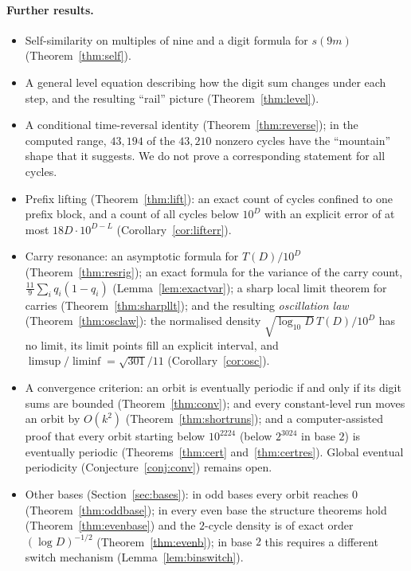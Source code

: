 \documentclass[11pt]{article}
\theoremstyle{definition}
\theoremstyle{remark}
\begin{document}
\paragraph{Further results.}
\begin{itemize}
\item Self-similarity on multiples of nine and a digit formula for $s(9m)$
  (Theorem~\ref{thm:self}).
\item A general level equation describing how the digit sum changes under
  each step, and the resulting ``rail'' picture (Theorem~\ref{thm:level}).
\item A conditional time-reversal identity (Theorem~\ref{thm:reverse}); in the
  computed range, $43{,}194$ of the $43{,}210$ nonzero cycles have the ``mountain'' shape
  that it suggests. We do not prove a corresponding statement for all cycles.
\item Prefix lifting (Theorem~\ref{thm:lift}): an exact count of cycles
  confined to one prefix block, and a count of all cycles below $10^D$ with an
  explicit error of at most $18D\cdot10^{D-L}$ (Corollary~\ref{cor:lifterr}).
\item Carry resonance: an asymptotic formula for $T(D)/10^D$
  (Theorem~\ref{thm:resrig}); an exact formula for the variance of the carry
  count, $\frac{11}9\sum_i q_i(1-q_i)$ (Lemma~\ref{lem:exactvar}); a sharp local
  limit theorem for carries (Theorem~\ref{thm:sharpllt}); and the resulting
  \emph{oscillation law} (Theorem~\ref{thm:osclaw}): the normalised density
  $\sqrt{\log_{10}D}\,T(D)/10^D$ has no limit, its limit points fill an
  explicit interval, and $\limsup/\liminf=\sqrt{301}/11$
  (Corollary~\ref{cor:osc}).
\item A convergence criterion: an orbit is eventually periodic if and only if
  its digit sums are bounded (Theorem~\ref{thm:conv}); and every
  constant-level run moves an orbit by $O(k^2)$ (Theorem~\ref{thm:shortruns});
  and a computer-assisted proof that every orbit starting below $10^{2224}$
  (below $2^{3024}$ in base $2$) is eventually periodic
  (Theorems~\ref{thm:cert} and~\ref{thm:certres}).
  Global eventual periodicity (Conjecture~\ref{conj:conv}) remains open.
\item Other bases (Section~\ref{sec:bases}): in odd bases every orbit reaches
  $0$ (Theorem~\ref{thm:oddbase}); in every even base the structure theorems
  hold (Theorem~\ref{thm:evenbase}) and the $2$-cycle density is of exact order
  $(\log D)^{-1/2}$ (Theorem~\ref{thm:evenb}); in base $2$ this requires a
  different switch mechanism (Lemma~\ref{lem:binswitch}).
\end{itemize}
\end{document}
